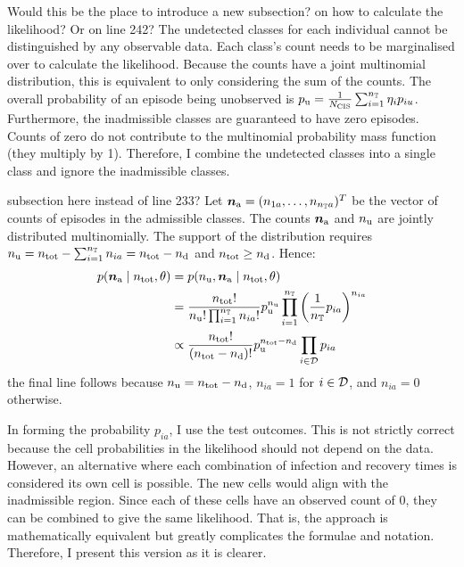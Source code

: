 \documentclass[thesis.tex]{subfiles}
\begin{document}
{\color{red} Would this be the place to introduce a new subsection? on how to calculate the likelihood? Or on line 242?}
The undetected classes for each individual cannot be distinguished by any observable data.
Each class's count needs to be marginalised over to calculate the likelihood.
Because the counts have a joint multinomial distribution, this is equivalent to only considering the sum of the counts.
The overall probability of an episode being unobserved is $p_\text{u} = \frac{1}{N_\text{CIS}} \sum_{i=1}^{n_{\mathbb{T}}} \eta_i p_{iu}$.
Furthermore, the inadmissible classes are guaranteed to have zero episodes.
Counts of zero do not contribute to the multinomial probability mass function (they multiply by 1).
Therefore, I combine the undetected classes into a single class and ignore the inadmissible classes.

{\color{red} subsection here instead of line 233?}
Let $\bm{n_\text{a}} = (n_{1a}, \dots, n_{n_{\mathbb{T}} a})^T$ be the vector of counts of episodes in the admissible classes.
The counts $\bm{n_\text{a}}$ and $n_\text{u}$ are jointly distributed multinomially.
The support of the distribution requires $n_\text{u} = n_\text{tot} - \sum_{i=1}^{n_{\mathbb{T}}} n_{ia} = n_\text{tot} - n_\text{d}$ and $n_\text{tot} \geq n_\text{d}$.
Hence:
\begin{align}
p(\bm{n_\text{a}} \mid n_\text{tot}, \theta)
&= p(n_\text{u}, \bm{n_\text{a}}\mid n_\text{tot}, \theta) \\
&= \frac{n_\text{tot}!}{n_\text{u}! \prod_{i=1}^{n_{\mathbb{T}}} n_{ia}!}  p_\text{u}^{n_\text{u}}\prod_{i=1}^{n_{\mathbb{T}}} \left(\frac{1}{n_{\mathbb{T}}}p_{ia}\right)^{n_{ia}} \\
&\propto \frac{n_\text{tot}!}{(n_\text{tot} - n_\text{d})!} p_\text{u}^{n_\text{tot} - n_\text{d}} \prod_{i \in \mathcal{D}} p_{ia} \label{perf-test:eq:augmented-likelihood}
\end{align}
the final line follows because $n_\text{u} = n_\text{tot} - n_\text{d}$, $n_{ia} = 1$ for $i \in \mathcal{D}$, and $n_{ia} = 0$ otherwise.

In forming the probability $p_{ia}$, I use the test outcomes.
This is not strictly correct because the cell probabilities in the likelihood should not depend on the data.
However, an alternative where each combination of infection and recovery times is considered its own cell is possible.
The new cells would align with the inadmissible region.
Since each of these cells have an observed count of 0, they can be combined to give the same likelihood.
That is, the approach is mathematically equivalent but greatly complicates the formulae and notation.
Therefore, I present this version as it is clearer.
\end{document}
